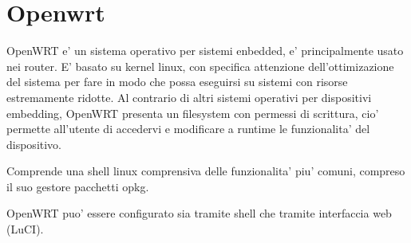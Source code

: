 
\section{Openwrt}

OpenWRT e' un sistema operativo per sistemi enbedded, e' principalmente usato nei router. E' basato su kernel linux, con specifica attenzione dell'ottimizazione del sistema per fare in modo che possa eseguirsi su sistemi con risorse estremamente ridotte.
Al contrario di altri sistemi operativi per dispositivi embedding, OpenWRT presenta un filesystem con permessi di scrittura, cio' permette all'utente di accedervi e modificare a runtime le funzionalita' del dispositivo.

Comprende una shell linux comprensiva delle funzionalita' piu' comuni, compreso il suo gestore pacchetti opkg.

OpenWRT puo' essere configurato sia tramite shell che tramite interfaccia web (LuCI).


